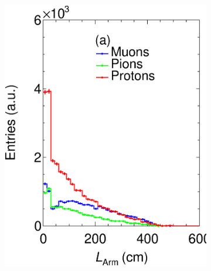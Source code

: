 \begin{figure}[t]
\begin{subfigure}[b]{0.32\textwidth}
         \includegraphics[width=\textwidth]{figures/ch5-KF_NDGAr/FullSample/Int/Props/LArmTall.eps}
         \caption{}
         \label{fig:LTPC_Int}
     \end{subfigure}
          \begin{subfigure}[b]{0.32\textwidth}
         \centering

\end{subfigure}
\end{figure}
